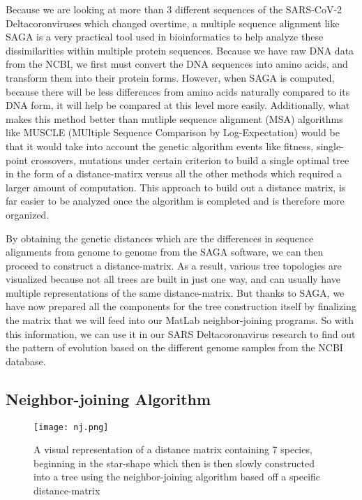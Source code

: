 Because we are looking at more than 3 different sequences of the SARS-CoV-2 Deltacoronviruses which changed overtime, a multiple sequence alignment like SAGA is a very practical tool used in bioinformatics to help analyze these dissimilarities within multiple protein sequences. Because we have raw DNA data from the NCBI, we first must convert the DNA sequences into amino acids, and transform them into their protein forms. However, when SAGA is computed, because there will be less differences from amino acids naturally compared to its DNA form, it will help be compared at this level more easily. Additionally, what makes this method better than mutliple sequence alignment (MSA) algorithms like MUSCLE (MUltiple Sequence Comparison by Log-Expectation) would be that it would take into account the genetic algorithm events like fitness, single-point crossovers, mutations under certain criterion to build a single optimal tree in the form of a distance-matirx versus all the other methods which required a larger amount of computation. This approach to build out a distance matrix, is far easier to be analyzed once the algorithm is completed and is therefore more organized. 

By obtaining the genetic distances which are the differences in sequence alignments from genome to genome from the SAGA software, we can then proceed to construct a distance-matrix. As a result, various tree topologies are visualized because not all trees are built in just one way, and can usually have multiple representations of the same distance-matrix. But thanks to SAGA, we have now prepared all the components for the tree construction itself by finalizing the matrix that we will feed into our MatLab neighbor-joining programs. So with this information, we can use it in our SARS Deltacoronavirus research to find out the pattern of evolution based on the different genome samples from the NCBI database.

\subsection{Neighbor-joining Algorithm}

\begin{figure}[h!]
\centering
\texttt{[image: nj.png]}
\caption{A visual representation of a distance matrix containing 7 species, beginning in the star-shape which then is then slowly constructed into a tree using the neighbor-joining algorithm based off a specific distance-matrix}
\end{figure}

